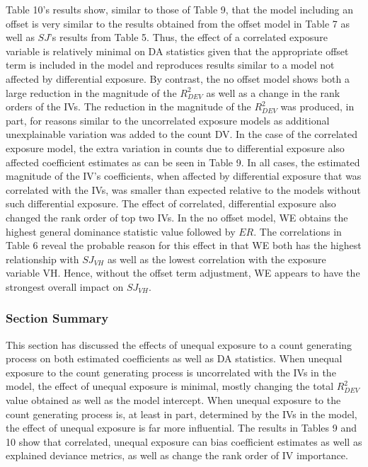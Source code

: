 \documentclass[ShortAfour,times,sageapa]{sagej}
\begin{document}
	Table 10's results show, similar to those of Table 9, that the model including an offset is very similar to the results obtained from the offset model in Table 7 as well as $SJ$'s results from Table 5.
	Thus, the effect of a correlated exposure variable is relatively minimal on DA statistics given that the appropriate offset term is included in the model and reproduces results similar to a model not affected by differential exposure.
	By contrast, the no offset model shows both a large reduction in the magnitude of the $R^2_{DEV}$ as well as a change in the rank orders of the IVs.
	The reduction in the magnitude of the $R^2_{DEV}$ was produced, in part, for reasons similar to the uncorrelated exposure models as additional unexplainable variation was added to the count DV. 
	In the case of the correlated exposure model, the extra variation in counts due to differential exposure also affected coefficient estimates as can be seen in Table 9.
	In all cases, the estimated magnitude of the IV's coefficients, when affected by differential exposure that was correlated with the IVs, was smaller than expected relative to the models without such differential exposure.
	The effect of correlated, differential exposure also changed the rank order of top two IVs.
	In the no offset model, WE obtains the highest general dominance statistic value followed by $ER$.
	The correlations in Table 6 reveal the probable reason for this effect in that WE both has the highest relationship with $SJ_{VH}$ as well as the lowest correlation with the exposure variable VH.
	Hence, without the offset term adjustment, WE appears to have the strongest overall impact on $SJ_{VH}$.
	
		\subsubsection{Section Summary}
		
	This section has discussed the effects of unequal exposure to a count generating process on both estimated coefficients as well as DA statistics.
	When unequal exposure to the count generating process is uncorrelated with the IVs in the model, the effect of unequal exposure is minimal, mostly changing the total $R^2_{DEV}$ value obtained as well as the model intercept.
	When unequal exposure to the count generating process is, at least in part, determined by the IVs in the model, the effect of unequal exposure is far more influential.
	The results in Tables 9 and 10 show that correlated, unequal exposure can bias coefficient estimates as well as explained deviance metrics, as well as change the rank order of IV importance.
	
\end{document}
